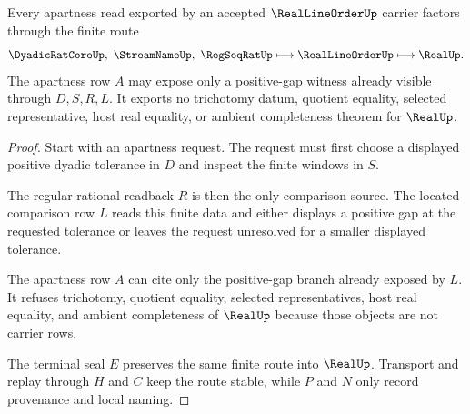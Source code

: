 \begin{theorem}
\label{thm:real-line-order-apartness-readback}
Every apartness read exported by an accepted $\RealLineOrderUp$ carrier factors through the finite route
$$
\DyadicRatCoreUp,\ \StreamNameUp,\ \RegSeqRatUp
\longmapsto
\RealLineOrderUp
\longmapsto
\RealUp .
$$
The apartness row $A$ may expose only a positive-gap witness already visible through $D,S,R,L$. It exports no trichotomy datum, quotient equality, selected representative, host real equality, or ambient completeness theorem for $\RealUp$.
\end{theorem}
\begin{proof}
Start with an apartness request. The request must first choose a displayed positive dyadic tolerance in $D$ and inspect the finite windows in $S$.

The regular-rational readback $R$ is then the only comparison source. The located comparison row $L$ reads this finite data and either displays a positive gap at the requested tolerance or leaves the request unresolved for a smaller displayed tolerance.

The apartness row $A$ can cite only the positive-gap branch already exposed by $L$. It refuses trichotomy, quotient equality, selected representatives, host real equality, and ambient completeness of $\RealUp$ because those objects are not carrier rows.

The terminal seal $E$ preserves the same finite route into $\RealUp$. Transport and replay through $H$ and $C$ keep the route stable, while $P$ and $N$ only record provenance and local naming.
\end{proof}

